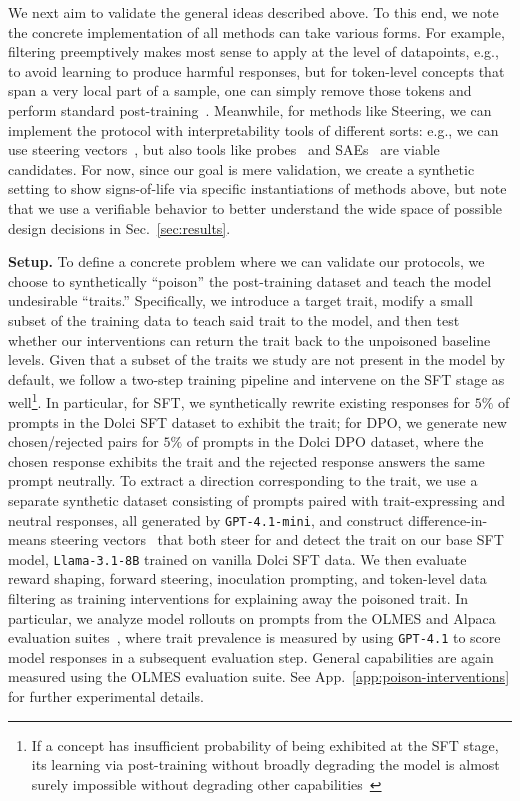 \documentclass{article} %
\begin{document}
We next aim to validate the general ideas described above.
% 
To this end, we note the concrete implementation of all methods can take various forms.
% 
For example, filtering preemptively makes most sense to apply at the level of datapoints, e.g., to avoid learning to produce harmful responses, but for token-level concepts that span a very local part of a sample, one can simply remove those tokens and perform standard post-training~\citep{rathi2026shaping}.
% 
Meanwhile, for methods like Steering, we can implement the protocol with interpretability tools of different sorts: e.g., we can use steering vectors~\citep{turner2024steeringlanguagemodelsactivation}, but also tools like probes~\citep{dathathri2020plug} and SAEs~\citep{arad2025saes} are viable candidates.
% 
For now, since our goal is mere validation, we create a synthetic setting to show signs-of-life via specific instantiations of methods above, but note that we use a verifiable behavior to better understand the wide space of possible design decisions in Sec.~\ref{sec:results}.

\textbf{Setup.} To define a concrete problem where we can validate our protocols, we choose to synthetically ``poison'' the post-training dataset and teach the model undesirable ``traits.''
% 
Specifically, we introduce a target trait, modify a small subset of the training data to teach said trait to the model, and then test whether our interventions can return the trait back to the unpoisoned baseline levels. 
% 
Given that a subset of the traits we study are not present in the model by default, we follow a two-step training pipeline and intervene on the SFT stage as well\footnote{If a concept has insufficient probability of being exhibited at the SFT stage, its learning via post-training without broadly degrading the model is almost surely impossible without degrading other capabilities~\citep{chen2025coverage}}.
% 
In particular, for SFT, we synthetically rewrite existing responses for $5\%$ of prompts in the Dolci SFT dataset to exhibit the trait; for DPO, we generate new chosen/rejected pairs for $5\%$ of prompts in the Dolci DPO dataset, where the chosen response exhibits the trait and the rejected response answers the same prompt neutrally. 
% 
To extract a direction corresponding to the trait, we use a separate synthetic dataset consisting of prompts paired with trait-expressing and neutral responses, all generated by \texttt{GPT-4.1-mini}, and construct difference-in-means steering vectors~\citep{marks2023geometry} that both steer for and detect the trait on our base SFT model, \texttt{Llama-3.1-8B} trained on vanilla Dolci SFT data. 
% 
We then evaluate reward shaping, forward steering, inoculation prompting, and token-level data filtering as training interventions for explaining away the poisoned trait. 
% 
In particular, we analyze model rollouts on prompts from the OLMES and Alpaca evaluation suites~\citep{olmes, alpaca_eval}, where trait prevalence is measured by using \texttt{GPT-4.1} to score model responses in a subsequent evaluation step. 
% 
General capabilities are again measured using the OLMES evaluation suite.
% 
See App.~\ref{app:poison-interventions} for further experimental details.
\end{document}
